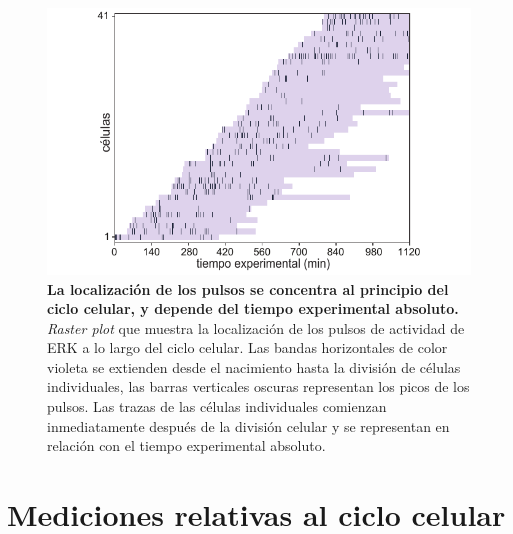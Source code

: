 \documentclass[./main.tex]{subfiles}
\begin{document}
\begin{figure}
    \centering
    \includegraphics[width=1\columnwidth]{figures/chapter4/C4_raster_plot.pdf}\caption{\textbf{La localización de los pulsos se concentra al principio del ciclo celular, y depende del tiempo experimental absoluto.} \textit{Raster plot} que muestra la localización de los pulsos de actividad de ERK a lo largo del ciclo celular. Las bandas horizontales de color violeta se extienden desde el nacimiento hasta la división de células individuales, las barras verticales oscuras representan los picos de los pulsos. Las trazas de las células individuales comienzan inmediatamente después de la división celular y se representan en relación con el tiempo experimental absoluto. }
    \label{C4_fig:raster_plot}
\end{figure}

\section{Mediciones relativas al ciclo celular}
\label{C4_sec:analisis}
\end{document}
